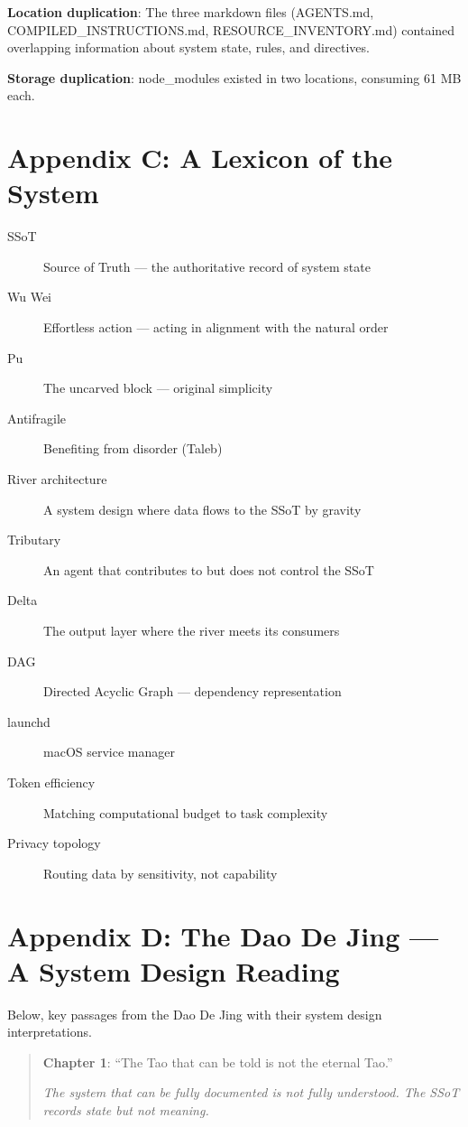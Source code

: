 \documentclass[12pt,a4paper,oneside]{book}
\begin{document}
\textbf{Location duplication}: The three markdown files (AGENTS.md, COMPILED\_INSTRUCTIONS.md, RESOURCE\_INVENTORY.md) contained overlapping information about system state, rules, and directives.

\textbf{Storage duplication}: node\_modules existed in two locations, consuming 61 MB each.

\chapter{Appendix C: A Lexicon of the System}

\begin{description}
  \item[SSoT] Source of Truth --- the authoritative record of system state
  \item[Wu Wei] Effortless action --- acting in alignment with the natural order
  \item[Pu] The uncarved block --- original simplicity
  \item[Antifragile] Benefiting from disorder (Taleb)
  \item[River architecture] A system design where data flows to the SSoT by gravity
  \item[Tributary] An agent that contributes to but does not control the SSoT
  \item[Delta] The output layer where the river meets its consumers
  \item[DAG] Directed Acyclic Graph --- dependency representation
  \item[launchd] macOS service manager
  \item[Token efficiency] Matching computational budget to task complexity
  \item[Privacy topology] Routing data by sensitivity, not capability
\end{description}

\chapter{Appendix D: The Dao De Jing --- A System Design Reading}

Below, key passages from the Dao De Jing with their system design interpretations.

\begin{quote}
\textbf{Chapter 1}: \enquote{The Tao that can be told is not the eternal Tao.}
\par\smallskip
\emph{The system that can be fully documented is not fully understood. The SSoT records state but not meaning.}
\end{quote}
\end{document}

